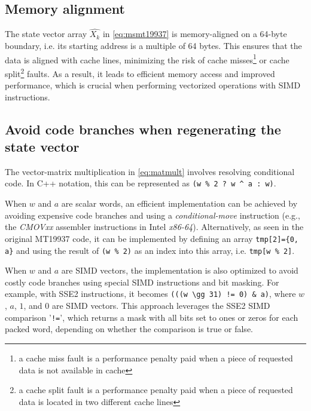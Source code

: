 \documentclass[preprint,1p,times]{elsarticle}
\begin{document}
	\subsection{Memory alignment}
	The state vector array $\hat{X_k}$ in \eqref{eq:msmt19937} is memory-aligned on a 64-byte boundary, i.e. its starting address is a multiple of 64 bytes. This ensures that the data is aligned with cache lines, minimizing the risk of cache misses\footnote{a cache miss fault is a performance penalty paid when a piece of requested data is not available in cache} or cache split\footnote{a cache split fault is a performance penalty paid when a piece of requested data is located in two different cache lines} faults. As a result, it leads to efficient memory access and improved performance, which is  crucial when performing vectorized operations with SIMD instructions.
	
	\subsection{Avoid code branches when regenerating the state vector}
	The vector-matrix multiplication in \eqref{eq:matmult} involves resolving conditional code. In C++ notation, this can be represented as \lstinline{(w % 2 ? w ^ a : w)}.
		
		When $w$ and $a$ are scalar words, an efficient implementation can be achieved by avoiding expensive code branches and using a \textit{conditional-move} instruction (e.g., the \textit{CMOVxx} assembler instructions in Intel \textit{x86-64}). Alternatively, as seen in the original MT19937 code, it can be implemented by defining an array \lstinline|tmp[2]={0, a}| and using the result of \lstinline{(w % 2)} as an index into this array, i.e. \lstinline{tmp[w % 2]}.
			
			When $w$ and $a$ are SIMD vectors, the implementation is also optimized to avoid costly code branches using special SIMD instructions and bit masking. For example, with SSE2 instructions, it becomes \lstinline{(((w \gg 31) != 0) & a)}, where $w$, $a$, $1$, and $0$ are SIMD vectors. This approach leverages the SSE2 SIMD comparison '\lstinline{!=}', which returns a mask with all bits set to ones or zeros for each packed word, depending on whether the comparison is true or false. 
			
\end{document}
